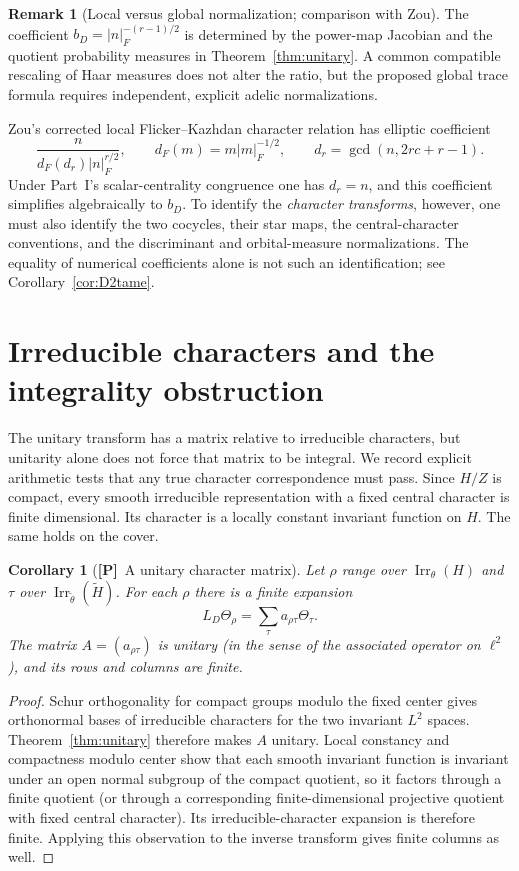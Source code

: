 \documentclass[11pt]{article}
\newcommand{\Irr}{\operatorname{Irr}}
\newcommand{\tH}{\widetilde H}
\newcommand{\Ptag}{\textnormal{\textbf{[P]}}}
\theoremstyle{plain}
\newtheorem{corollary}[theorem]{Corollary}
\theoremstyle{definition}
\newtheorem{remark}[theorem]{Remark}
\begin{document}
\begin{remark}[Local versus global normalization; comparison with Zou]\label{rem:normalizations}
The coefficient $b_D=|n|_F^{-(r-1)/2}$ is determined by the
power-map Jacobian and the quotient probability measures in
Theorem~\ref{thm:unitary}. A common compatible rescaling of Haar
measures does not alter the ratio, but the proposed global trace
formula requires independent, explicit adelic normalizations.

Zou's corrected local Flicker--Kazhdan character relation
\cite[(3.2) and Remark~3.3]{Zou} has elliptic coefficient
\[
  \frac{n}{d_F(d_r)|n|_F^{r/2}},\qquad
  d_F(m)=m|m|_F^{-1/2},\qquad
  d_r=\gcd(n,2rc+r-1).
\]
Under Part~I's scalar-centrality congruence one has $d_r=n$, and
this coefficient simplifies algebraically to $b_D$.
To identify the \emph{character transforms}, however, one must also
identify the two cocycles, their star maps, the central-character
conventions, and the discriminant and orbital-measure normalizations.
The equality of numerical coefficients alone is not such an
identification; see Corollary~\ref{cor:D2tame}.
\end{remark}

\section{Irreducible characters and the integrality obstruction}\label{sec:characters}
The unitary transform has a matrix relative to irreducible characters,
but unitarity alone does not force that matrix to be integral.
We record explicit arithmetic tests that any true character
correspondence must pass.
Since $H/Z$ is compact, every smooth irreducible representation with a fixed central character is finite dimensional. Its character is a locally constant invariant function on $H$. The same holds on the cover.

\begin{corollary}[\Ptag\ A unitary character matrix]\label{cor:matrix}
Let $\rho$ range over $\Irr_\theta(H)$ and $\tau$ over $\Irr_{\widetilde\theta}(\tH)$. For each $\rho$ there is a \emph{finite} expansion
\begin{equation}\label{eq:matrix}
L_D\Theta_\rho=\sum_{\tau}a_{\rho\tau}\Theta_\tau.
\end{equation}
The matrix $A=(a_{\rho\tau})$ is unitary (in the sense of the associated operator on $\ell^2$), and its rows and columns are finite.
\end{corollary}
\begin{proof}
Schur orthogonality for compact groups modulo the fixed center gives orthonormal bases of irreducible characters for the two invariant $L^2$ spaces. Theorem~\ref{thm:unitary} therefore makes $A$ unitary. Local constancy and compactness modulo center show that each smooth invariant function is invariant under an open normal subgroup of the compact quotient, so it factors through a finite quotient (or through a corresponding finite-dimensional projective quotient with fixed central character). Its irreducible-character expansion is therefore finite. Applying this observation to the inverse transform gives finite columns as well.
\end{proof}
\end{document}
